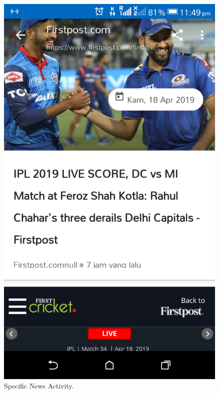 \begin{appendices}
\begin{figure}[!ht]
	\centering
	\includegraphics[scale=0.2]{news-one.png}
	\caption{\label{img22}  Specific News Activity.}
\end{figure}


\end{appendices}
